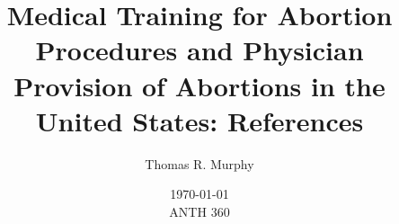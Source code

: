 \documentclass[letterpaper, 12pt]{article}
\title{Medical Training for Abortion Procedures and Physician Provision of Abortions in the United States: References}
\author{Thomas R. Murphy}
\date{\today\\ANTH 360}
\begin{document}
\maketitle

\nocite{*}
\printbibliography
\end{document}
